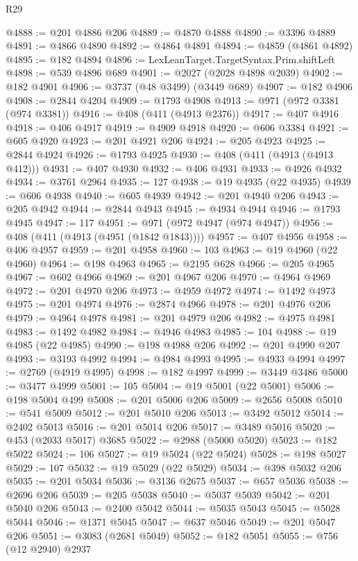 \begin{lexlean}{R29}
\begin{coremodule}
@4888 := @201 @4886 @206
@4889 := @4870 @4888
@4890 := @3396 @4889
@4891 := @4866 @4890
@4892 := @4864 @4891
@4894 := @4859 (@4861 @4892)
@4895 := @182 @4894
@4896 := LexLeanTarget.TargetSyntax.Prim.shiftLeft
@4898 := @539 @4896 @689
@4901 := @2027 (@2028 @4898 @2039)
@4902 := @182 @4901
@4906 := @3737 (@48 @3499) (@3449 @689)
@4907 := @182 @4906
@4908 := @2844 @4204
@4909 := @1793 @4908
@4913 := @971 (@972 @3381 (@974 @3381))
@4916 := @408 (@411 (@4913 @2376))
@4917 := @407 @4916
@4918 := @406 @4917
@4919 := @4909 @4918
@4920 := @606 @3384
@4921 := @605 @4920
@4923 := @201 @4921 @206
@4924 := @205 @4923
@4925 := @2844 @4924
@4926 := @1793 @4925
@4930 := @408 (@411 (@4913 (@4913 @412)))
@4931 := @407 @4930
@4932 := @406 @4931
@4933 := @4926 @4932
@4934 := @3761 @2964
@4935 := 127
@4938 := @19 @4935 (@22 @4935)
@4939 := @606 @4938
@4940 := @605 @4939
@4942 := @201 @4940 @206
@4943 := @205 @4942
@4944 := @2844 @4943
@4945 := @4934 @4944
@4946 := @1793 @4945
@4947 := 117
@4951 := @971 (@972 @4947 (@974 @4947))
@4956 := @408 (@411 (@4913 (@4951 (@1842 @1843))))
@4957 := @407 @4956
@4958 := @406 @4957
@4959 := @201 @4958
@4960 := 103
@4963 := @19 @4960 (@22 @4960)
@4964 := @198 @4963
@4965 := @2195 @628
@4966 := @205 @4965
@4967 := @602 @4966
@4969 := @201 @4967 @206
@4970 := @4964 @4969
@4972 := @201 @4970 @206
@4973 := @4959 @4972
@4974 := @1492 @4973
@4975 := @201 @4974
@4976 := @2874 @4966
@4978 := @201 @4976 @206
@4979 := @4964 @4978
@4981 := @201 @4979 @206
@4982 := @4975 @4981
@4983 := @1492 @4982
@4984 := @4946 @4983
@4985 := 104
@4988 := @19 @4985 (@22 @4985)
@4990 := @198 @4988 @206
@4992 := @201 @4990 @207
@4993 := @3193 @4992
@4994 := @4984 @4993
@4995 := @4933 @4994
@4997 := @2769 (@4919 @4995)
@4998 := @182 @4997
@4999 := @3449 @3486
@5000 := @3477 @4999
@5001 := 105
@5004 := @19 @5001 (@22 @5001)
@5006 := @198 @5004 @499
@5008 := @201 @5006 @206
@5009 := @2656 @5008
@5010 := @541 @5009
@5012 := @201 @5010 @206
@5013 := @3492 @5012
@5014 := @2402 @5013
@5016 := @201 @5014 @206
@5017 := @3489 @5016
@5020 := @453 (@2033 @5017) @3685
@5022 := @2988 (@5000 @5020)
@5023 := @182 @5022
@5024 := 106
@5027 := @19 @5024 (@22 @5024)
@5028 := @198 @5027
@5029 := 107
@5032 := @19 @5029 (@22 @5029)
@5034 := @398 @5032 @206
@5035 := @201 @5034
@5036 := @3136 @2675
@5037 := @657 @5036
@5038 := @2696 @206
@5039 := @205 @5038
@5040 := @5037 @5039
@5042 := @201 @5040 @206
@5043 := @2400 @5042
@5044 := @5035 @5043
@5045 := @5028 @5044
@5046 := @1371 @5045
@5047 := @637 @5046
@5049 := @201 @5047 @206
@5051 := @3083 (@2681 @5049)
@5052 := @182 @5051
@5055 := @756 (@12 @2940) @2937

\end{coremodule}
\end{lexlean}
